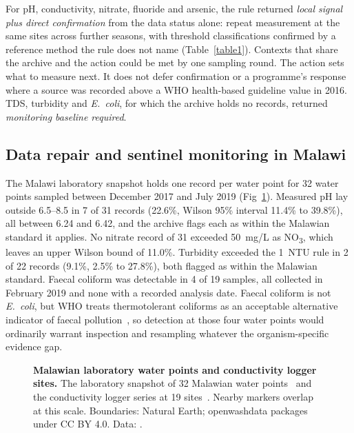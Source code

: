 \documentclass[10pt,letterpaper]{article}
\begin{document}
For pH, conductivity, nitrate, fluoride and arsenic, the rule returned \textit{local signal plus direct confirmation} from the data status alone: repeat measurement at the same sites across further seasons, with threshold classifications confirmed by a reference method the rule does not name (Table~\ref{table1}). Contexts that share the archive and the action could be met by one sampling round. The action sets what to measure next. It does not defer confirmation or a programme's response where a source was recorded above a WHO health-based guideline value in 2016. TDS, turbidity and \textit{E.~coli}, for which the archive holds no records, returned \textit{monitoring baseline required}.

\subsection*{Data repair and sentinel monitoring in Malawi}

The Malawi laboratory snapshot holds one record per water point for 32 water points sampled between December 2017 and July 2019 (Fig~\ref{fig:malawi-map}). Measured pH lay outside 6.5--8.5 in 7 of 31 records (22.6\%, Wilson 95\% interval 11.4\% to 39.8\%), all between 6.24 and 6.42, and the archive flags each as within the Malawian standard it applies. No nitrate record of 31 exceeded 50~mg/L as NO\textsubscript{3}, which leaves an upper Wilson bound of 11.0\%. Turbidity exceeded the 1~NTU rule in 2 of 22 records (9.1\%, 2.5\% to 27.8\%), both flagged as within the Malawian standard. Faecal coliform was detectable in 4 of 19 samples, all collected in February 2019 and none with a recorded analysis date. Faecal coliform is not \textit{E.~coli}, but WHO treats thermotolerant coliforms as an acceptable alternative indicator of faecal pollution~\cite{WHO2022GDWQ}, so detection at those four water points would ordinarily warrant inspection and resampling whatever the organism-specific evidence gap.\label{callout:fig:malawi-map}

\begin{figure}[!ht]
\caption{\textbf{Malawian laboratory water points and conductivity logger sites.} The laboratory snapshot of 32 Malawian water points~\cite{OWD-boreholelabdata} and the conductivity logger series at 19 sites~\cite{OWD-mwgroundwaterdata}. Nearby markers overlap at this scale. Boundaries: Natural Earth; openwashdata packages under CC BY 4.0. Data: .}
\label{fig:malawi-map}
\end{figure}
\end{document}

